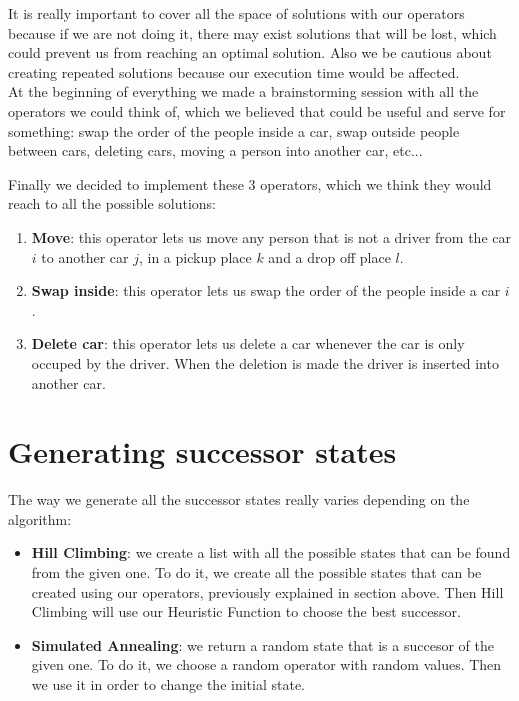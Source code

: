 \documentclass[12]{article}
\begin{document}
It is really important to cover all the space of solutions with our operators because if we are not doing it, there may exist solutions that will be lost, which could prevent us from reaching an optimal solution. Also we be cautious about creating repeated solutions because our execution time would be affected. 
\\

At the beginning of everything we made a brainstorming session with all the operators we could think of, which we believed that could be useful and serve for something: swap the order of the people inside a car, swap outside people between cars, deleting cars, moving a person into another car, etc...

Finally we decided to implement these 3 operators, which we think they would reach to all the possible solutions:

\begin{enumerate}
\item \textbf{Move}: this operator lets us move any person that is not a driver from the car $i$ to another car $j$, in a pickup place $k$ and a drop off place $l$.  
\item \textbf{Swap inside}: this operator lets us swap the order of the people inside a car $i$.
\item \textbf{Delete car}: this operator lets us delete a car whenever the car is only occuped by the driver. When the deletion is made the driver is inserted into another car. 
\end{enumerate}



\section{Generating successor states}
The way we generate all the successor states really varies depending on the algorithm:
\begin{itemize}
\item \textbf{Hill Climbing}: we create a list with all the possible states that can be found from the given one. To do it, we create all the possible states that can be created using our operators, previously explained in section above. Then Hill Climbing will use our Heuristic Function to choose the best successor.
\item \textbf{Simulated Annealing}: we return a random state that is a succesor of the given one. To do it, we choose a random operator with random values. Then we use it in order to change the initial state.  
\end{itemize}
\end{document}

